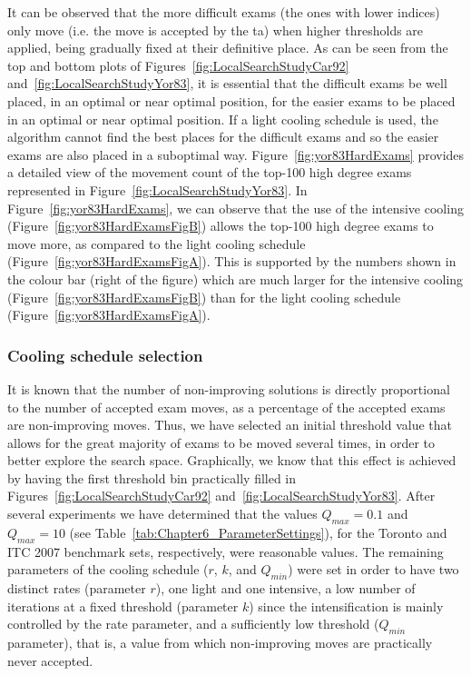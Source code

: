 It can be observed that the more difficult exams (the ones with lower indices) only move (i.e. the move is accepted by the \gls{ta}) when higher thresholds are applied, being gradually fixed at their definitive place. As can be seen from the top and bottom plots of Figures~\ref{fig:LocalSearchStudyCar92} and~\ref{fig:LocalSearchStudyYor83}, it is essential that the difficult exams be well placed, in an optimal or near optimal position, for the easier exams to be placed in an optimal or near optimal position. If a light cooling schedule is used, the algorithm cannot find the best places for the difficult exams and so the easier exams are also placed in a suboptimal way. Figure~\ref{fig:yor83HardExams} provides a detailed view of the movement count of the top-100 high degree exams represented in Figure~\ref{fig:LocalSearchStudyYor83}. In Figure~\ref{fig:yor83HardExams}, we can observe that the use of the intensive cooling (Figure~\ref{fig:yor83HardExamsFigB}) allows the top-100 high degree exams to move more, as compared to the light cooling schedule (Figure~\ref{fig:yor83HardExamsFigA}). This is supported by the numbers shown in the colour bar (right of the figure) which are much larger for the intensive cooling (Figure~\ref{fig:yor83HardExamsFigB}) than for the light cooling schedule (Figure~\ref{fig:yor83HardExamsFigA}).


\subsubsection{Cooling schedule selection}

It is known that the number of non-improving solutions is directly proportional to the number of accepted exam moves, as a percentage of the accepted exams are non-improving moves. Thus, we have selected an initial threshold value that allows for the great majority of exams to be moved several times, in order to better explore the search space. Graphically, we know that this effect is achieved by having the first threshold bin practically filled in Figures~\ref{fig:LocalSearchStudyCar92} and~\ref{fig:LocalSearchStudyYor83}. After several experiments we have determined that the values $Q_{max}=0.1$ and $Q_{max}=10$ (see Table~\ref{tab:Chapter6_ParameterSettings}), for the Toronto and ITC 2007 benchmark sets, respectively, were reasonable values. The remaining parameters of the cooling schedule ($r$, $k$, and $Q_{min}$) were set in order to have two distinct rates (parameter $r$), one light and one intensive, a low number of iterations at a fixed threshold (parameter $k$) since the intensification is mainly controlled by the rate parameter, and a sufficiently low threshold ($Q_{min}$ parameter), that is, a value from which non-improving moves are practically never accepted.




